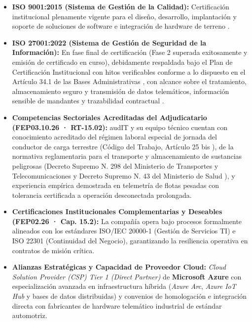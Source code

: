 \begin{itemize}
    \item \textbf{ISO 9001:2015 (Sistema de Gestión de la Calidad):} Certificación institucional plenamente vigente para el diseño, desarrollo, implantación y soporte de soluciones de software e integración de hardware de terreno \parencite{iso9001}.
    \item \textbf{ISO 27001:2022 (Sistema de Gestión de Seguridad de la Información):} En fase final de certificación (Fase 2 superada exitosamente y emisión de certificado en curso), debidamente respaldada bajo el Plan de Certificación Institucional con hitos verificables conforme a lo dispuesto en el Artículo 34.1 de las Bases Administrativas \parencite{bases_admin_2026}, con alcance sobre el tratamiento, almacenamiento seguro y transmisión de datos telemáticos, información sensible de mandantes y trazabilidad contractual \parencite{iso27001}.
    \item \textbf{Competencias Sectoriales Acreditadas del Adjudicatario (FEP03.10.26 · RT-15.02):} audIT y su equipo técnico cuentan con conocimiento acreditado del régimen laboral especial de jornada del conductor de carga terrestre (Código del Trabajo, Artículo 25 bis \parencite{codigo_trabajo_25bis}), de la normativa reglamentaria para el transporte y almacenamiento de sustancias peligrosas (Decreto Supremo N.\textordmasculine{} 298 del Ministerio de Transportes y Telecomunicaciones \parencite{ds298} y Decreto Supremo N.\textordmasculine{} 43 del Ministerio de Salud \parencite{ds43}), y experiencia empírica demostrada en telemetría de flotas pesadas con tolerancia certificada a operación desconectada prolongada.
    \item \textbf{Certificaciones Institucionales Complementarias y Deseables (FEP02.26 · Cap. 15.2):} La compañía opera bajo procesos formalmente alineados con los estándares ISO/IEC 20000-1 \parencite{iso20000_1} (Gestión de Servicios TI) e ISO 22301 \parencite{iso22301} (Continuidad del Negocio), garantizando la resiliencia operativa en contratos de misión crítica.
    \item \textbf{Alianzas Estratégicas y Capacidad de Proveedor Cloud:} \emph{Cloud Solution Provider (CSP) Tier 1 (Direct Partner)} de \textbf{Microsoft Azure} con especialización avanzada en infraestructura híbrida (\emph{Azure Arc}, \emph{Azure IoT Hub} y bases de datos distribuidas) y convenios de homologación e integración directa con fabricantes de hardware telemático industrial de estándar automotriz.
\end{itemize}

